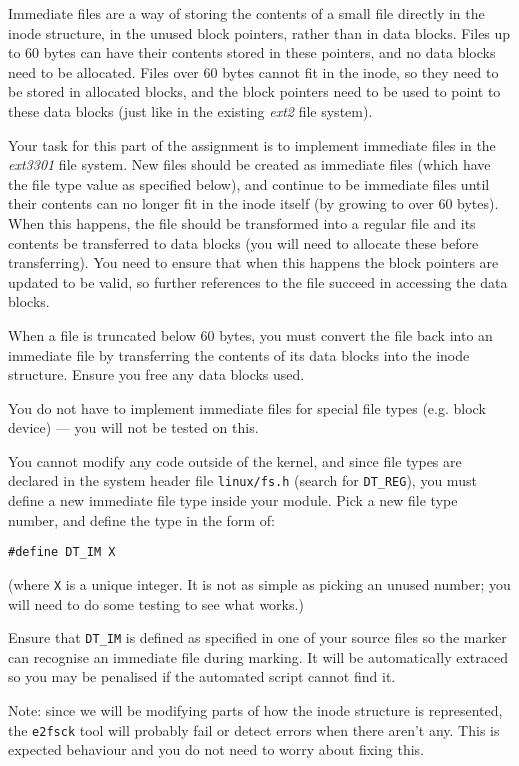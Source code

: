 \documentclass[12pt,a4paper]{article}
\begin{document}
Immediate files are a way of storing the contents of a small file directly in
the inode structure, in the unused block pointers, rather than in data blocks.
Files up to 60 bytes can have their contents stored in these pointers, and no
data blocks need to be allocated. Files over 60 bytes cannot fit in the inode,
so they need to be stored in allocated blocks, and the block pointers need to
be used to point to these data blocks (just like in the existing \textit{ext2}
file system).

Your task for this part of the assignment is to implement immediate files in
the \textit{ext3301} file system. New files should be created as immediate
files (which have the file type value as specified below), and continue to be immediate
files until their contents can no longer fit in the inode itself (by growing to
over 60 bytes). When this happens, the file should be transformed into a
regular file and its contents be transferred to data blocks (you will need to
allocate these before transferring). You need to ensure that when this happens
the block pointers are updated to be valid, so further references to the file
succeed in accessing the data blocks.

When a file is truncated below 60 bytes, you must convert the file back into an
immediate file by transferring the contents of its data blocks into the inode
structure. Ensure you free any data blocks used.

You do not have to implement immediate files for special file types (e.g. block
device) --- you will not be tested on this.

You cannot modify any code outside of the kernel, and since file types are
declared in the system header file \texttt{linux/fs.h} (search for \texttt{DT\_REG}),
you must define a new immediate file type inside your module. Pick a new file type
number, and define the type in the form of:

\texttt{\#define DT\_IM X}

(where \verb|X| is a unique integer. It is not as simple as picking an unused number;
you will need to do some testing to see what works.)

Ensure that \texttt{DT\_IM} is defined as specified in one of your source files
so the marker can recognise an immediate file during marking. It will be
automatically extraced so you may be penalised if the automated script cannot
find it.

Note: since we will be modifying parts of how the inode structure is
represented, the \texttt{e2fsck} tool will probably fail or detect errors when
there aren't any.  This is expected behaviour and you do not need to worry
about fixing this.
\end{document}
